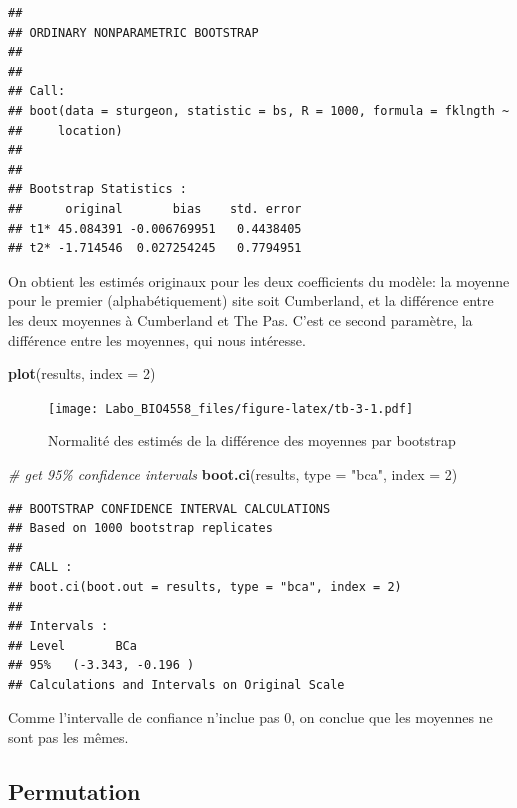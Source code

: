 \documentclass[
  12pt,
]{book}
\newenvironment{Shaded}{\begin{snugshade}}{\end{snugshade}}
\newcommand{\CommentTok}[1]{\textcolor[rgb]{0.56,0.35,0.01}{\textit{#1}}}
\newcommand{\DataTypeTok}[1]{\textcolor[rgb]{0.13,0.29,0.53}{#1}}
\newcommand{\DecValTok}[1]{\textcolor[rgb]{0.00,0.00,0.81}{#1}}
\newcommand{\KeywordTok}[1]{\textcolor[rgb]{0.13,0.29,0.53}{\textbf{#1}}}
\newcommand{\NormalTok}[1]{#1}
\newcommand{\StringTok}[1]{\textcolor[rgb]{0.31,0.60,0.02}{#1}}
\begin{document}
\begin{verbatim}
## 
## ORDINARY NONPARAMETRIC BOOTSTRAP
## 
## 
## Call:
## boot(data = sturgeon, statistic = bs, R = 1000, formula = fklngth ~ 
##     location)
## 
## 
## Bootstrap Statistics :
##      original       bias    std. error
## t1* 45.084391 -0.006769951   0.4438405
## t2* -1.714546  0.027254245   0.7794951
\end{verbatim}

On obtient les estimés originaux pour les deux coefficients du modèle: la moyenne pour le premier (alphabétiquement) site soit Cumberland, et la différence entre les deux moyennes à Cumberland et The Pas. C'est ce second paramètre, la différence entre les moyennes, qui nous intéresse.

\begin{Shaded}
\begin{Highlighting}[]
\KeywordTok{plot}\NormalTok{(results, }\DataTypeTok{index =} \DecValTok{2}\NormalTok{)}
\end{Highlighting}
\end{Shaded}

\begin{figure}
\centering
\texttt{[image: Labo\_BIO4558\_files/figure-latex/tb-3-1.pdf]}
\caption{\label{fig:tb-3}Normalité des estimés de la différence des moyennes par bootstrap}
\end{figure}

\begin{Shaded}
\begin{Highlighting}[]
\CommentTok{\# get 95\% confidence intervals}
\KeywordTok{boot.ci}\NormalTok{(results, }\DataTypeTok{type =} \StringTok{"bca"}\NormalTok{, }\DataTypeTok{index =} \DecValTok{2}\NormalTok{)}
\end{Highlighting}
\end{Shaded}

\begin{verbatim}
## BOOTSTRAP CONFIDENCE INTERVAL CALCULATIONS
## Based on 1000 bootstrap replicates
## 
## CALL : 
## boot.ci(boot.out = results, type = "bca", index = 2)
## 
## Intervals : 
## Level       BCa          
## 95%   (-3.343, -0.196 )  
## Calculations and Intervals on Original Scale
\end{verbatim}

Comme l'intervalle de confiance n'inclue pas 0, on conclue que les moyennes ne sont pas les mêmes.

\hypertarget{permutation}{%
\subsection{Permutation}\label{permutation}}
\end{document}
